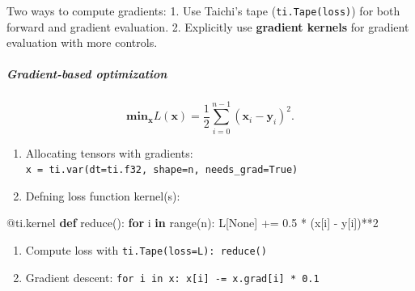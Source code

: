 \documentclass[11pt]{article}
\providecommand{\tightlist}{%
      \setlength{\itemsep}{0pt}\setlength{\parskip}{0pt}}
\newenvironment{Shaded}{}{}
\newcommand{\KeywordTok}[1]{\textcolor[rgb]{0.00,0.44,0.13}{\textbf{{#1}}}}
\newcommand{\DecValTok}[1]{\textcolor[rgb]{0.25,0.63,0.44}{{#1}}}
\newcommand{\FloatTok}[1]{\textcolor[rgb]{0.25,0.63,0.44}{{#1}}}
\newcommand{\NormalTok}[1]{{#1}}
\newcommand{\VariableTok}[1]{\textcolor[rgb]{0.10,0.09,0.49}{{#1}}}
\newcommand{\ControlFlowTok}[1]{\textcolor[rgb]{0.00,0.44,0.13}{\textbf{{#1}}}}
\newcommand{\OperatorTok}[1]{\textcolor[rgb]{0.40,0.40,0.40}{{#1}}}
\newcommand{\BuiltInTok}[1]{{#1}}
\newcommand{\AttributeTok}[1]{\textcolor[rgb]{0.49,0.56,0.16}{{#1}}}
\begin{document}
Two ways to compute gradients: 1. Use Taichi's tape
(\texttt{ti.Tape(loss)}) for both forward and gradient evaluation. 2.
Explicitly use \textbf{gradient kernels} for gradient evaluation with
more controls.

\hypertarget{gradient-based-optimization}{%
\subparagraph{Gradient-based
optimization}\label{gradient-based-optimization}}

\begin{equation*}
\mathbf{min}_{\mathbf{x}} L(\mathbf{x})=\frac{1}{2}\sum_{i=0}^{n-1}(\mathbf{x}_{i}-\mathbf{y}_{i})^{2}.
\end{equation*}

\begin{enumerate}
\def\labelenumi{\arabic{enumi}.}
\tightlist
\item
  Allocating tensors with gradients:
  \texttt{x\ =\ ti.var(dt=ti.f32,\ shape=n,\ needs\_grad=True)}
\item
  Defning loss function kernel(s):
\end{enumerate}

\begin{Shaded}
\begin{Highlighting}[]
\AttributeTok{@ti.kernel}
\KeywordTok{def} \BuiltInTok{reduce}\NormalTok{():}
    \ControlFlowTok{for}\NormalTok{ i }\KeywordTok{in} \BuiltInTok{range}\NormalTok{(n):}
\NormalTok{        L[}\VariableTok{None}\NormalTok{] }\OperatorTok{+=} \FloatTok{0.5} \OperatorTok{*}\NormalTok{ (x[i] }\OperatorTok{{-}}\NormalTok{ y[i])}\OperatorTok{**}\DecValTok{2}
\end{Highlighting}
\end{Shaded}

\begin{enumerate}
\def\labelenumi{\arabic{enumi}.}
\setcounter{enumi}{2}
\tightlist
\item
  Compute loss with \texttt{ti.Tape(loss=L):\ reduce()}
\item
  Gradient descent:
  \texttt{for\ i\ in\ x:\ x{[}i{]}\ -=\ x.grad{[}i{]}\ *\ 0.1}
\end{enumerate}
\end{document}
